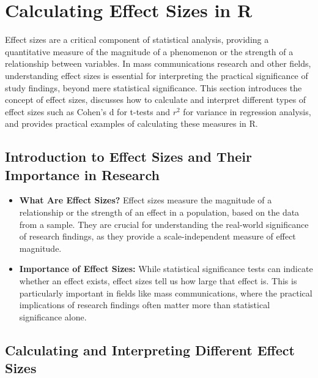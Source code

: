 \documentclass[
]{book}
\begin{document}
\hypertarget{calculating-effect-sizes-in-r}{%
\section{Calculating Effect Sizes in R}\label{calculating-effect-sizes-in-r}}

Effect sizes are a critical component of statistical analysis, providing a quantitative measure of the magnitude of a phenomenon or the strength of a relationship between variables. In mass communications research and other fields, understanding effect sizes is essential for interpreting the practical significance of study findings, beyond mere statistical significance. This section introduces the concept of effect sizes, discusses how to calculate and interpret different types of effect sizes such as Cohen's d for t-tests and \(r^2\) for variance in regression analysis, and provides practical examples of calculating these measures in R.

\hypertarget{introduction-to-effect-sizes-and-their-importance-in-research}{%
\subsection*{Introduction to Effect Sizes and Their Importance in Research}\label{introduction-to-effect-sizes-and-their-importance-in-research}}

\begin{itemize}
\item
  \textbf{What Are Effect Sizes?} Effect sizes measure the magnitude of a relationship or the strength of an effect in a population, based on the data from a sample. They are crucial for understanding the real-world significance of research findings, as they provide a scale-independent measure of effect magnitude.
\item
  \textbf{Importance of Effect Sizes:} While statistical significance tests can indicate whether an effect exists, effect sizes tell us how large that effect is. This is particularly important in fields like mass communications, where the practical implications of research findings often matter more than statistical significance alone.
\end{itemize}

\hypertarget{calculating-and-interpreting-different-effect-sizes}{%
\subsection*{Calculating and Interpreting Different Effect Sizes}\label{calculating-and-interpreting-different-effect-sizes}}
\end{document}
